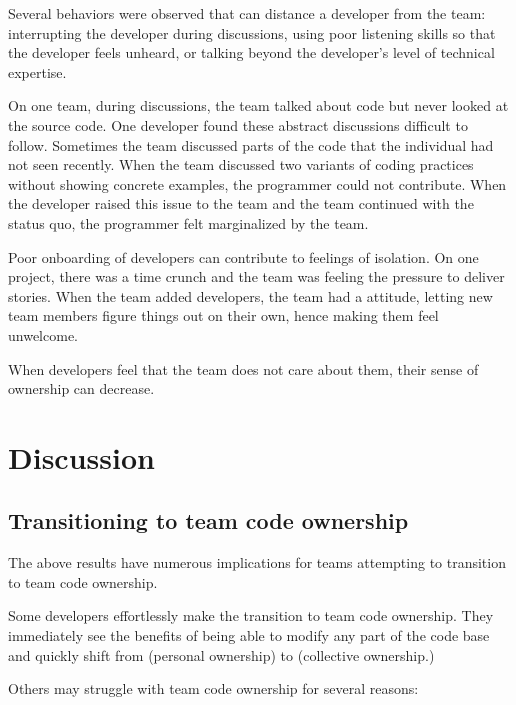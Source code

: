 Several behaviors were observed that can distance a developer from the team: interrupting the developer during discussions, using poor listening skills so that the developer feels unheard, or talking beyond the developer's level of technical expertise. 

On one team, during discussions, the team talked about code but never looked at the source code. One developer found these abstract discussions difficult to follow. Sometimes the team discussed parts of the code that the individual had not seen recently. When the team discussed two variants of coding practices without showing concrete examples, the programmer could not contribute. When the developer raised this issue to the team and the team continued with the status quo, the programmer felt marginalized by the team.

Poor onboarding of developers can contribute to feelings of isolation. On one project, there was a time crunch and the team was feeling the pressure to deliver stories. When the team added developers, the team had a  attitude, letting new team members figure things out on their own, hence making them feel unwelcome.

When developers feel that the team does not care about them, their sense of ownership can decrease.

\section{Discussion}
\label{Discussion}
\subsection{Transitioning to team code ownership}
\label{Transitioning}

The above results have numerous implications for teams attempting to transition to team code ownership. 

Some developers effortlessly make the transition to team code ownership. They immediately see the benefits of being able to modify any part of the code base and quickly shift from  (personal ownership) to  (collective ownership.)

Others may struggle with team code ownership for several reasons:

